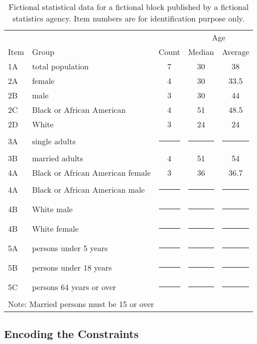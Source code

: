 \documentclass[runningheads]{llncs}
\begin{document}
\newcommand{\cens}{\multicolumn{1}{c|}{\rule{6mm}{3mm}}}
\begin{table}
\caption{Fictional statistical data for a fictional block published by
  a fictional statistics agency. Item numbers are for identification
  purpose only.\label{fictional}}
\begin{center}
\begin{tabular}{l|l|c|c|c|}
     &                           &       & \multicolumn{2}{|c|}{Age} \\
Item & Group                     & Count & Median & Average \\
\hline
  1A & total population          & 7     &  30    & 38 \\
\hline
  2A & female                    & 4     &  30    & 33.5 \\
  2B & male                      & 3     &  30    & 44 \\
  2C & Black or African American & 4     &  51    & 48.5 \\
  2D & White                     & 3     &  24    & 24 \\
\hline
  3A & single adults             & \cens & \cens  & \cens \\
  3B & married adults            & 4     & 51     & 54 \\
\hline
  4A & Black or African American female              & 3     & 36     & 36.7 \\
  4A & Black or African American male                & \cens & \cens  & \cens \\
  4B & White male                & \cens & \cens  & \cens \\
  4B & White female              & \cens & \cens  & \cens \\
\hline
  5A & persons under 5 years     & \cens & \cens  & \cens \\
  5B & persons under 18 years    & \cens & \cens  & \cens \\
  5C & persons 64 years or over  & \cens & \cens  & \cens \\
\hline
\multicolumn{5}{l}{Note: Married persons must be 15 or over}
\end{tabular}
\end{center}
\end{table}

\subsection{Encoding the Constraints}
\end{document}
